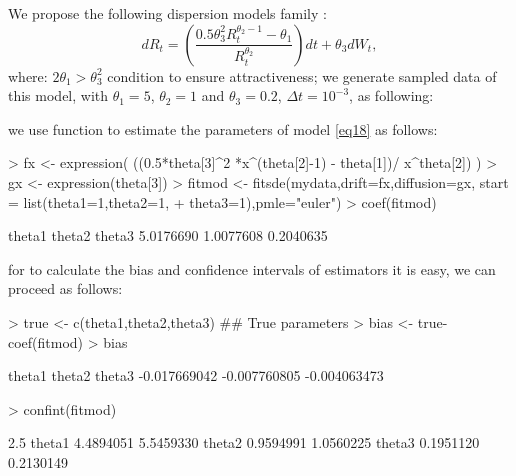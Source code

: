 We propose the following dispersion models family \citep{Boukhetala1996}:
\begin{equation}\label{eq18}
    dR_t = \left( \frac{0.5 \theta^{2}_{3} R_t^{ \theta_{2} - 1} - \theta_{1}}{R_t^{\theta_{2}}} \right) dt + \theta_{3} dW_{t},
\end{equation}
where: $2 \theta_{1}> \theta^{2}_{3}$ condition to ensure attractiveness; we generate sampled data of this model, with
$\theta_{1}=5$, $\theta_{2}=1$ and $\theta_{3}=0.2$, $\Delta t =10^{-3}$, as following:
\begin{Schunk}
\end{Schunk}
we use  function to estimate the parameters of model \eqref{eq18} as follows:
\begin{Schunk}
\begin{Sinput}
> fx <- expression( ((0.5*theta[3]^2 *x^(theta[2]-1) - theta[1])/ x^theta[2])  )
> gx <- expression(theta[3])
> fitmod <- fitsde(mydata,drift=fx,diffusion=gx, start = list(theta1=1,theta2=1,
+                 theta3=1),pmle="euler")
> coef(fitmod)
\end{Sinput}
\begin{Soutput}
   theta1    theta2    theta3
5.0176690 1.0077608 0.2040635
\end{Soutput}
\end{Schunk}
for to calculate the bias and confidence intervals of estimators it is easy, we can proceed as follows:
\begin{Schunk}
\begin{Sinput}
> true <- c(theta1,theta2,theta3)   ## True parameters
> bias <- true-coef(fitmod)
> bias
\end{Sinput}
\begin{Soutput}
      theta1       theta2       theta3
-0.017669042 -0.007760805 -0.004063473
\end{Soutput}
\begin{Sinput}
> confint(fitmod)
\end{Sinput}
\begin{Soutput}
           2.5 %
theta1 4.4894051 5.5459330
theta2 0.9594991 1.0560225
theta3 0.1951120 0.2130149
\end{Soutput}
\end{Schunk}
